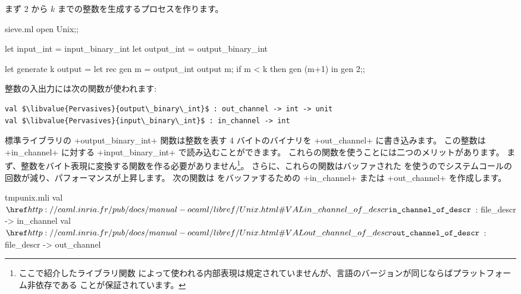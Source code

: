 まず 2 から $k$ までの整数を生成するプロセスを作ります。
%
\begin{listingcodefile}{sieve.ml}
open Unix;;

let input_int = input_binary_int
let output_int = output_binary_int

let generate k output =
  let rec gen m =
    output_int output m;
    if m < k then gen (m+1)
  in
  gen 2;;
\end{listingcodefile}
整数の入出力には次の関数が使われます:
%
\begin{lstlisting}
val $\libvalue{Pervasives}{output\_binary\_int}$ : out_channel -> int -> unit
val $\libvalue{Pervasives}{input\_binary\_int}$ : in_channel -> int
\end{lstlisting}
%
標準ライブラリの \ml+output_binary_int+ 関数は整数を表す 4 バイトのバイナリを
\ml+out_channel+ に書き込みます。
この整数は \ml+in_channel+ に対する \ml+input_binary_int+ で読み込むことができます。
これらの関数を使うことには二つのメリットがあります。
まず、整数をバイト表現に変換する関数を作る必要がありません\footnote{ここで紹介したライブラリ関数
  によって使われる内部表現は規定されていませんが、言語のバージョンが同じならばプラットフォーム非依存である
  ことが保証されています。}。
さらに、これらの関数はバッファされた \io を使うのでシステムコールの回数が減り、パフォーマンスが上昇します。
次の関数は \io をバッファするための \ml+in_channel+ または \ml+out_channel+ を作成します。
%
\begin{listingcodefile}{tmpunix.mli}
val $\indexlibvalue{Unix}{in\_channel\_of\_descr}$ : file_descr -> in_channel
val $\indexlibvalue{Unix}{out\_channel\_of\_descr}$ : file_descr -> out_channel
\end{listingcodefile}
